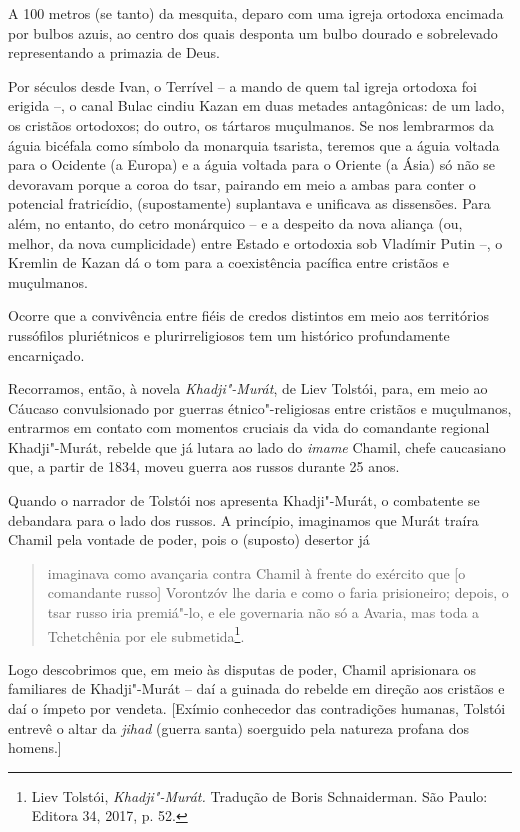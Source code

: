 A 100 metros (se tanto) da mesquita, deparo com uma igreja ortodoxa
encimada por bulbos azuis, ao centro dos quais desponta um bulbo dourado
e sobrelevado representando a primazia de Deus.

Por séculos desde Ivan, o Terrível -- a mando de quem tal igreja
ortodoxa foi erigida --, o canal Bulac cindiu Kazan em duas metades
antagônicas: de um lado, os cristãos ortodoxos; do outro, os tártaros
muçulmanos. Se nos lembrarmos da águia bicéfala como símbolo da
monarquia tsarista, teremos que a águia voltada para o Ocidente (a
Europa) e a águia voltada para o Oriente (a Ásia) só não se devoravam
porque a coroa do tsar, pairando em meio a ambas para conter o potencial
fratricídio, (supostamente) suplantava e unificava as dissensões. Para
além, no entanto, do cetro monárquico -- e a despeito da nova aliança
(ou, melhor, da nova cumplicidade) entre Estado e ortodoxia sob Vladímir
Putin --, o Kremlin de Kazan dá o tom para a coexistência pacífica entre
cristãos e muçulmanos.

Ocorre que a convivência entre fiéis de credos distintos em meio aos
territórios russófilos pluriétnicos e plurirreligiosos tem um histórico
profundamente encarniçado.

Recorramos, então, à novela \emph{Khadji"-Murát}, de Liev Tolstói, para,
em meio ao Cáucaso convulsionado por guerras étnico"-religiosas entre
cristãos e muçulmanos, entrarmos em contato com momentos cruciais da
vida do comandante regional Khadji"-Murát, rebelde que já lutara ao lado
do \emph{imame} Chamil, chefe caucasiano que, a partir de 1834, moveu
guerra aos russos durante 25 anos.

Quando o narrador de Tolstói nos apresenta Khadji"-Murát, o combatente se
debandara para o lado dos russos. A princípio, imaginamos que Murát
traíra Chamil pela vontade de poder, pois o (suposto) desertor já

\begin{quote}
imaginava como avançaria contra Chamil à frente do exército que {[}o
comandante russo{]} Vorontzóv lhe daria e como o faria prisioneiro;
depois, o tsar russo iria premiá"-lo, e ele governaria não só a Avaria,
mas toda a Tchetchênia por ele submetida\footnote{Liev Tolstói,
  \emph{Khadji"-Murát.} Tradução de Boris Schnaiderman. São Paulo:
  Editora 34, 2017, p. 52.}.
\end{quote}

Logo descobrimos que, em meio às disputas de poder, Chamil aprisionara
os familiares de Khadji"-Murát -- daí a guinada do rebelde em direção aos
cristãos e daí o ímpeto por vendeta. {[}Exímio conhecedor das
contradições humanas, Tolstói entrevê o altar da \emph{jihad} (guerra
santa) soerguido pela natureza profana dos homens.{]}

